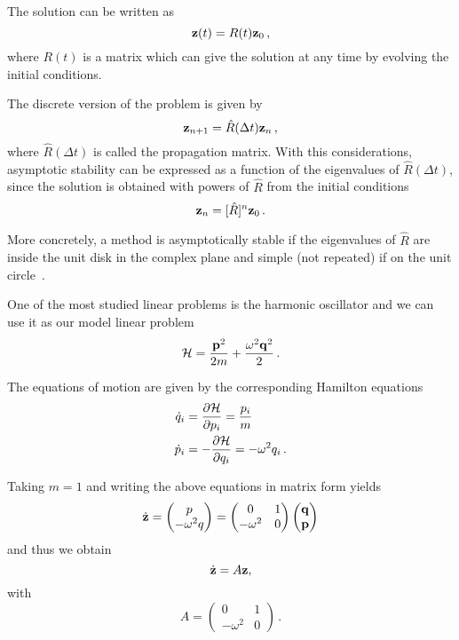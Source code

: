 \documentclass[class=report, crop=false]{standalone}
\begin{document}
The solution can be written as
\begin{equation*}
  \vb{z}(t) = R(t) \vb{z}_0\,,
\end{equation*}
where \(R(t)\) is a matrix which can give the solution at any time by evolving
the initial conditions.

The discrete version of the problem is given by
\begin{equation}
  \label{eq:discrete-linear-problem}
  \vb{z}_{n+1} = \hat{R}(\Delta t) \vb{z}_n\,,
\end{equation}
where \(\hat{R}(\Delta t)\) is called the propagation matrix.
With this considerations, asymptotic stability can be expressed as a function
of the eigenvalues of \(\hat{R}(\Delta t)\), since the solution is obtained
with powers of \(\hat{R}\) from the initial conditions
\begin{equation*}
  \vb{z}_n = [\hat{R}]^n \vb{z}_0\,.
\end{equation*}

More concretely, a method is asymptotically stable if the eigenvalues of
\(\hat{R}\) are inside the unit disk in the complex plane and simple (not repeated)
if on the unit circle~\autocite[28]{leimkuhler_simulatinghamiltonian_2004}.

One of the most studied linear problems is the harmonic oscillator and we can use
it as our model linear problem
\[
\mathcal{H} = \frac{\vb{p}^2}{2m} + \frac{\omega^2 \vb{q}^2}{2}\,.
\]

The equations of motion are given by the corresponding Hamilton equations
\begin{align*}
  \dot{q}_i &= \pdv{\mathcal{H}}{p_i} = \frac{p_i}{m} \\
  \dot{p}_i &= -\pdv{\mathcal{H}}{q_i} = -\omega^2 q_i\,.
\end{align*}

Taking \(m=1\) and writing the above equations in matrix form yields
\[
\dot{\vb{z}} =
\begin{pmatrix}
  p \\
  -\omega^2 q
\end{pmatrix} =
\begin{pmatrix}
  0 & 1 \\
  -\omega^2 & 0
\end{pmatrix}
\begin{pmatrix}
  \vb{q} \\
  \vb{p}
\end{pmatrix}
\]
and thus we obtain
\[
\dot{\vb{z}} = A \vb{z},
\]
with
\[
A =
\begin{pmatrix}
  0 & 1 \\
  -\omega^2 & 0
\end{pmatrix}\,.
\]
\end{document}
